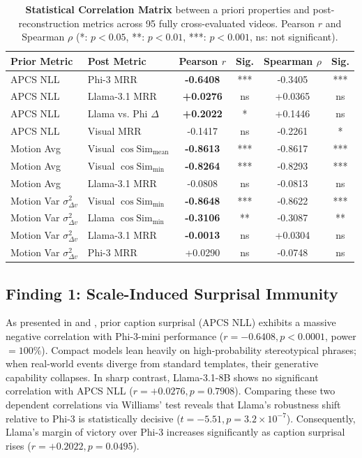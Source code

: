 \documentclass[10pt,twocolumn,letterpaper]{article}
\begin{document}
\begin{table}[t]
\centering
\footnotesize
\setlength{\tabcolsep}{1.8pt}
\caption{\textbf{Statistical Correlation Matrix} between a priori properties and post-reconstruction metrics across 95 fully cross-evaluated videos. Pearson \(r\) and Spearman \(\rho\) (*: \(p < 0.05\), **: \(p < 0.01\), ***: \(p < 0.001\), ns: not significant).}
\label{tab:correlations}
\begin{tabular}{llcccc}
\toprule
\textbf{Prior Metric} & \textbf{Post Metric} & \textbf{Pearson \(r\)} & \textbf{Sig.} & \textbf{Spearman \(\rho\)} & \textbf{Sig.} \\
\midrule
APCS NLL & Phi-3 MRR & \textbf{-0.6408} & *** & -0.3405 & *** \\
APCS NLL & Llama-3.1 MRR & \textbf{+0.0276} & ns & +0.0365 & ns \\
APCS NLL & Llama vs. Phi \(\Delta\) & \textbf{+0.2022} & * & +0.1446 & ns \\
APCS NLL & Visual MRR & -0.1417 & ns & -0.2261 & * \\
\midrule
Motion Avg & Visual \(\cos\text{Sim}_{\text{mean}}\) & \textbf{-0.8613} & *** & -0.8617 & *** \\
Motion Avg & Visual \(\cos\text{Sim}_{\min}\) & \textbf{-0.8264} & *** & -0.8293 & *** \\
Motion Avg & Llama-3.1 MRR & -0.0808 & ns & -0.0813 & ns \\
\midrule
Motion Var \(\sigma^2_{\Delta v}\) & Visual \(\cos\text{Sim}_{\min}\) & \textbf{-0.8648} & *** & -0.8622 & *** \\
Motion Var \(\sigma^2_{\Delta v}\) & Llama \(\cos\text{Sim}_{\min}\) & \textbf{-0.3106} & ** & -0.3087 & ** \\
Motion Var \(\sigma^2_{\Delta v}\) & Llama-3.1 MRR & \textbf{-0.0013} & ns & +0.0304 & ns \\
Motion Var \(\sigma^2_{\Delta v}\) & Phi-3 MRR & +0.0290 & ns & -0.0748 & ns \\
\bottomrule
\end{tabular}
\vspace{-2mm}
\end{table}

\subsection{Finding 1: Scale-Induced Surprisal Immunity}
As presented in  and , prior caption surprisal (APCS NLL) exhibits a massive negative correlation with Phi-3-mini performance (\(r = -0.6408, p < 0.0001\), power \(= 100\%\)). Compact models lean heavily on high-probability stereotypical phrases; when real-world events diverge from standard templates, their generative capability collapses.
In sharp contrast, Llama-3.1-8B shows no significant correlation with APCS NLL (\(r = +0.0276, p = 0.7908\)). Comparing these two dependent correlations via Williams' test reveals that Llama's robustness shift relative to Phi-3 is statistically decisive (\(t = -5.51, p = 3.2 \times 10^{-7}\)). Consequently, Llama's margin of victory over Phi-3 increases significantly as caption surprisal rises (\(r = +0.2022, p = 0.0495\)).
\end{document}
